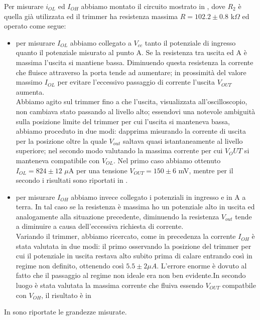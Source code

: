 Per misurare $i_{OL}$ ed $I_{OH}$ abbiamo montato il circuito mostrato in , dove $R_2$ è quella già utilizzata ed il trimmer ha resistenza massima $R = 102.2 \pm 0.8$ k$\Omega$ ed operato come segue:
\begin{itemize}
\item per misurare $I_{OL}$ abbiamo collegato a $V_{cc}$ tanto il potenziale di ingresso quanto il potenziale misurato al punto A. 
Se la resistenza tra uscita ed A è massima l'uscita si mantiene bassa. Diminuendo questa resistenza la corrente che fluisce attraverso la porta tende ad aumentare; in prossimità del valore massimo $I_{OL}$ per evitare l'eccessivo passaggio di corrente l'uscita $V_{OUT}$ aumenta.\\
 Abbiamo agito sul trimmer fino a che l'uscita, visualizzata all'oscilloscopio, non cambiava stato passando al livello alto; essendovi una notevole ambiguità sulla posizione limite del trimmer per cui l'uscita si manteneva bassa, abbiamo proceduto in due modi: dapprima misurando la corrente di uscita per la posizione oltre la quale $V_{out}$ saltava quasi istantaneamente al livello superiore; nel secondo modo valutando la massima corrente per cui $V_OUT$ si manteneva compatibile con $V_{OL}$. Nel primo caso abbiamo ottenuto $I_{OL} = 824 \pm 12$ $\mu$A per una tensione $V_{OUT}=150 \pm 6$ mV, mentre per il secondo i risultati sono riportati in  .
\item per misurare $I_{OH}$ abbiamo invece collegato i potenziali in ingresso e in A a terra. In tal caso se la resistenza è massima ho un potenziale alto in uscita ed analogamente alla situazione precedente, diminuendo la resistenza  $V_{out}$ tende a diminuire a causa dell'eccessiva richiesta di corrente. \\
Variando il trimmer, abbiamo ricercato, come in precedenza la corrente $I_{OH}$ è stata valutata in due modi: il primo osservando la posizione del trimmer per cui il potenziale in uscita restava alto subito prima di calare entrando così in regime non definito, ottenendo così $5.5\pm 2 \mu A$. L'errore enorme è dovuto al fatto che il passaggio al regime non ideale era non ben evidente.In secondo luogo è stata valutata la massima corrente che fluiva essendo $V_{OUT}$ compatbile con $V_{OH}$, il risultato è in  
\end{itemize}
In  sono riportate le grandezze misurate.\\
